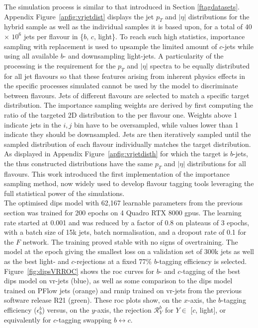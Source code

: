 The simulation process is similar to that introduced in Section \ref{ftagdatasets}. Appendix Figure~\ref{apfig:vrjetdist} displays the jet $p_T$ and $|\eta|$ distributions for the hybrid sample as well as the individual samples it is based upon, for a total of 40 $\times$ $10^6$ jets per flavour in \{$b$, $c$, light\}. To reach such high statistics, importance sampling with replacement is used to upsample the limited amount of $c$-jets while using all available $b$- and downsampling light-jets. A particularity of the processing is the requirement for the $p_T$ and $|\eta|$ spectra to be equally distributed for all jet flavours so that these features arising from inherent physics effects in the specific processes simulated cannot be used by the model to discriminate between flavours. Jets of different flavours are selected to match a specific target distribution. The importance sampling weights are derived by first computing the ratio of the targeted 2D distribution to the per flavour one. Weights above 1 indicate jets in the $i, j$ bin have to be oversampled, while values lower than 1 indicate they should be downsampled. Jets are then iteratively sampled until the sampled distribution of each flavour individually matches the target distribution. As displayed in Appendix Figure~\ref{apfig:vrjetdisth} for which the target is $b$-jets, the thus constructed distributions have the same $p_T$ and $|\eta|$ distributions for all flavours. This work introduced the first implementation of the importance sampling method, now widely used to develop flavour tagging tools leveraging the full statistical power of the simulations. \\ 
 
The optimised \gls{dips} model with 62,167 learnable parameters from the previous section was trained for 200 epochs on 4 Quadro RTX 8000 \glspl{gpu}. The learning rate started at 0.001 and was reduced by a factor of 0.8 on plateaus of 3 epochs, with a batch size of 15k jets, batch normalisation, and a dropout rate of 0.1 for the $F$ network. The training proved stable with no signs of overtraining. The model at the epoch giving the smallest loss on a validation set of 300k jets as well as the best light- and $c$-rejections at a fixed 77\% $b$-tagging efficiency is selected. Figure~\ref{fig:dipsVRROC} shows the \gls{roc} curves for $b$- and $c$-tagging of the best \gls{dips} model on \gls{vr}-jets (blue), as well as some comparison to the \gls{dips} model trained on PFlow jets (orange) and \gls{rnnip} trained on \gls{vr}-jets from the previous software release R21 (green). These \gls{roc} plots show, on the $x$-axis, the $b$-tagging efficiency ($\epsilon^b_b$) versus, on the $y$-axis, the rejection $\mathcal{R}^b_Y$ for $Y \in$ [$c$, light], or equivalently for $c$-tagging swapping $b \leftrightarrow c$.\\

